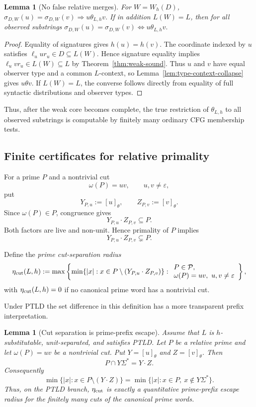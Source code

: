 \documentclass[11pt,a4paper]{article}
\newtheorem{lemma}[theorem]{Lemma}
\newcommand{\eps}{\varepsilon}
\newcommand{\Pcal}{\mathcal P}
\begin{document}
\begin{lemma}[No false relative merges]
\label{lem:no-false-merge}
For $W=W_h(D)$,
\(\sigma_{D,W}(u)=\sigma_{D,W}(v) \Longrightarrow u\theta_{L,h}v.\)
If in addition $L(W)=L$, then for all observed substrings
\(\sigma_{D,W}(u)=\sigma_{D,W}(v) \iff u\theta_{L,h}v.\)
\end{lemma}

\begin{proof}
Equality of signatures gives $h(u)=h(v)$.  The coordinate indexed by $u$ satisfies $\ell_u u r_u\in D\subseteq L(W)$.  Hence signature equality implies $\ell_u v r_u\in L(W)\subseteq L$ by Theorem~\ref{thm:weak-sound}.  Thus $u$ and $v$ have equal observer type and a common $L$-context, so Lemma~\ref{lem:type-context-collapse} gives $u\theta v$.  If $L(W)=L$, the converse follows directly from equality of full syntactic distributions and observer types.
\end{proof}

Thus, after the weak core becomes complete, the true restriction of $\theta_{L,h}$ to all observed substrings is computable by finitely many ordinary CFG membership tests.

\subsection{Finite certificates for relative primality}

For a prime $P$ and a nontrivial cut
\[
  \omega(P)=uv,
  \qquad u,v\ne\eps,
\]
put
\[
  Y_{P,u}:=[u]_\theta,
  \qquad
  Z_{P,v}:=[v]_\theta.
\]
Since $\omega(P)\in P$, congruence gives
\[
  Y_{P,u}\cdot Z_{P,v}\subseteq P.
\]
Both factors are live and non-unit.  Hence primality of $P$ implies
\[
  Y_{P,u}\cdot Z_{P,v}\subsetneq P.
\]

Define the \emph{prime cut-separation radius}
\[
  \eta_{\rm cut}(L,h)
  :=
  \max
  \left\{
    \min\{|x|:
      x\in P\setminus
      (Y_{P,u}\cdot Z_{P,v})
    \}:
    \begin{array}{l}
      P\in\Pcal,\\
      \omega(P)=uv,\ u,v\ne\eps
    \end{array}
  \right\},
\]
with $\eta_{\rm cut}(L,h)=0$ if no canonical prime word has a nontrivial cut.

Under PTLD the set difference in this definition has a more transparent
prefix interpretation.

\begin{lemma}[Cut separation is prime-prefix escape]
\label{lem:cut-prefix-escape}
Assume that $L$ is $h$-substitutable, unit-separated, and satisfies PTLD.  Let $P$ be a relative prime and let
$\omega(P)=uv$ be a nontrivial cut.  Put
$Y=[u]_\theta$ and $Z=[v]_\theta$.  Then
\[
  P\cap Y\Sigma^*=Y\cdot Z.
\]
Consequently
\[
  \min\{|x|:x\in P\setminus(Y\cdot Z)\}
  =
  \min\{|x|:x\in P,\ x\notin Y\Sigma^*\}.
\]
Thus, on the PTLD branch, $\eta_{\rm cut}$ is exactly a quantitative
prime-prefix escape radius for the finitely many cuts of the canonical
prime words.
\end{lemma}
\end{document}

